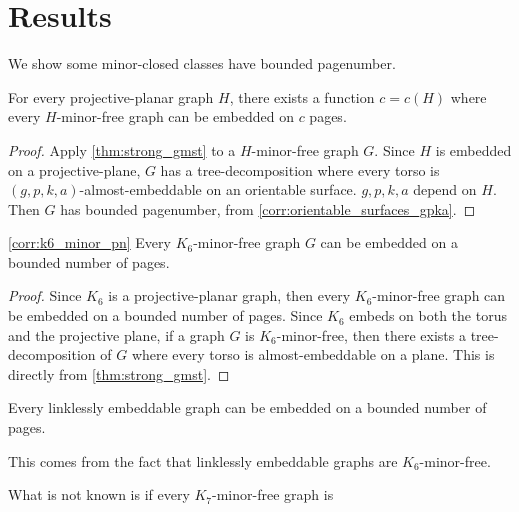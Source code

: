 \section{Results}
We show some minor-closed classes have bounded pagenumber.

\begin{proposition}
	For every projective-planar graph $H$, there exists a function $c = c(H)$ where every $H$-minor-free graph can be embedded on $c$ pages. 
\end{proposition}
\begin{proof}
	Apply \cref{thm:strong_gmst} to a $H$-minor-free graph $G$. Since $H$ is embedded on a projective-plane, $G$ has a tree-decomposition where every torso is $(g,p,k,a)$-almost-embeddable on an orientable surface. $g, p, k,a$ depend on $H$. Then $G$ has bounded pagenumber, from \cref{corr:orientable_surfaces_gpka}.
\end{proof}

\begin{corollary}\cref{corr:k6_minor_pn}
	Every $K_6$-minor-free graph $G$ can be embedded on a bounded number of pages.
\end{corollary}

\begin{proof}
	Since $K_6$ is a projective-planar graph, then every $K_6$-minor-free graph can be embedded on a bounded number of pages. Since $K_6$ embeds on both the torus and the projective plane, if a graph $G$ is $K_6$-minor-free, then there exists a tree-decomposition of $G$ where every torso is almost-embeddable on a plane. This is directly from \cref{thm:strong_gmst}. 
\end{proof}
\begin{corollary}
    Every linklessly embeddable graph can be embedded on a bounded number of pages.
\end{corollary}
This comes from the fact that linklessly embeddable graphs are $K_6$-minor-free.

What is not known is if every $K_7$-minor-free graph is 


